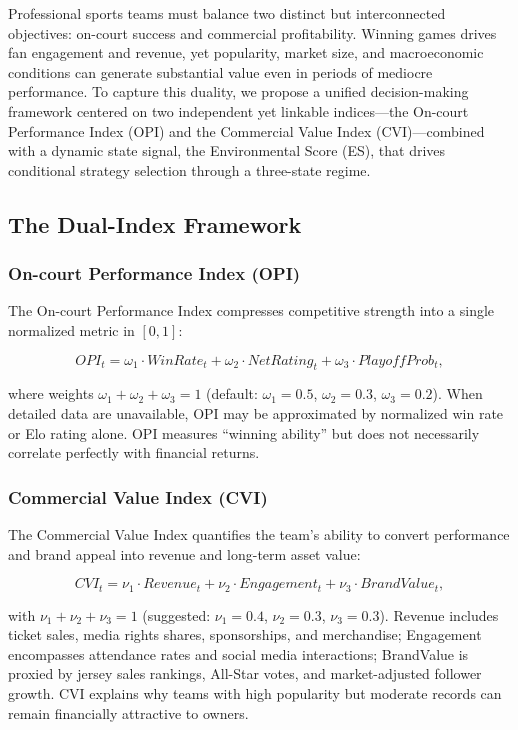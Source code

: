 \documentclass{mcmthesis}
\begin{document}
Professional sports teams must balance two distinct but interconnected objectives: on-court success and commercial profitability. Winning games drives fan engagement and revenue, yet popularity, market size, and macroeconomic conditions can generate substantial value even in periods of mediocre performance. To capture this duality, we propose a unified decision-making framework centered on two independent yet linkable indices—the On-court Performance Index (OPI) and the Commercial Value Index (CVI)—combined with a dynamic state signal, the Environmental Score (ES), that drives conditional strategy selection through a three-state regime.

\subsection{The Dual-Index Framework}

\subsubsection{On-court Performance Index (OPI)}
The On-court Performance Index compresses competitive strength into a single normalized metric in $[0,1]$:

\[
OPI_t = \omega_1 \cdot WinRate_t + \omega_2 \cdot NetRating_t + \omega_3 \cdot PlayoffProb_t,
\]

where weights $\omega_1 + \omega_2 + \omega_3 = 1$ (default: $\omega_1 = 0.5$, $\omega_2 = 0.3$, $\omega_3 = 0.2$\cite{FiveThirtyEightNBA}). When detailed data are unavailable, OPI may be approximated by normalized win rate or Elo rating alone. OPI measures ``winning ability'' but does not necessarily correlate perfectly with financial returns.

\subsubsection{Commercial Value Index (CVI)}
The Commercial Value Index quantifies the team's ability to convert performance and brand appeal into revenue and long-term asset value:

\[
CVI_t = \nu_1 \cdot Revenue_t + \nu_2 \cdot Engagement_t + \nu_3 \cdot BrandValue_t,
\]

with $\nu_1 + \nu_2 + \nu_3 = 1$ (suggested: $\nu_1 = 0.4$, $\nu_2 = 0.3$, $\nu_3 = 0.3$). Revenue includes ticket sales, media rights shares, sponsorships, and merchandise; Engagement encompasses attendance rates and social media interactions; BrandValue is proxied by jersey sales rankings, All-Star votes, and market-adjusted follower growth. CVI explains why teams with high popularity but moderate records can remain financially attractive to owners.
\end{document}
